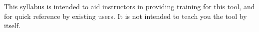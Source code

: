 \documentclass[a4paper]{article}
\begin{document}
This syllabus is intended to aid instructors in providing training for this tool, and for quick reference by existing users. It is not intended to teach you the tool by itself.

\end{document}
